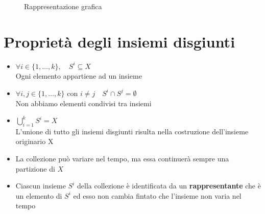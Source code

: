 \begin{figure}[htbp]
\caption*{Rappresentazione grafica}
\end{figure}

\newpage
\section{Proprietà degli insiemi disgiunti}
    \begin{itemize}
        \item $\forall i \in \{1, \dots, k\}, \quad S^i \subseteq X$ \\ Ogni elemento appartiene ad un insieme
        \item $\forall i,j \in \{1, \dots, k\} \text{ con $i \not = j$} \quad S^i \cap S^j = \emptyset$\\ Non abbiamo elementi condivisi tra insiemi
        \item $\bigcup_{i=1}^{k} S^i = X$\\ L'unione di tutto gli insiemi disgiunti risulta nella costruzione dell'insieme originario X
        \item La collezione può variare nel tempo, ma essa continuerà sempre una partizione di $X$
        \item Ciascun insieme $S^i$ della collezione è identificata da un \textbf{rappresentante} che è un elemento di $S^i$ ed esso non cambia fintato che l'insieme non varia nel tempo
    \end{itemize}

